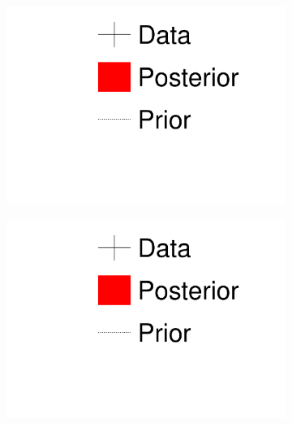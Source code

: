 \begin{figure}[h]
	\begin{subfigure}[t]{0.15\textwidth}
		\includegraphics[width=\textwidth, trim={0mm 90mm 0mm 0mm}, clip,page=1]{figures/mach3/1D_legend_Data_Posterior_Prior}
	\end{subfigure}
	\begin{subfigure}[t]{0.15\textwidth}
		\includegraphics[width=\textwidth, trim={0mm 45mm 0mm 50mm}, clip,page=1]{figures/mach3/1D_legend_Data_Posterior_Prior}
	\end{subfigure}	\begin{subfigure}[t]{0.15\textwidth}

\end{subfigure}
\end{figure}
